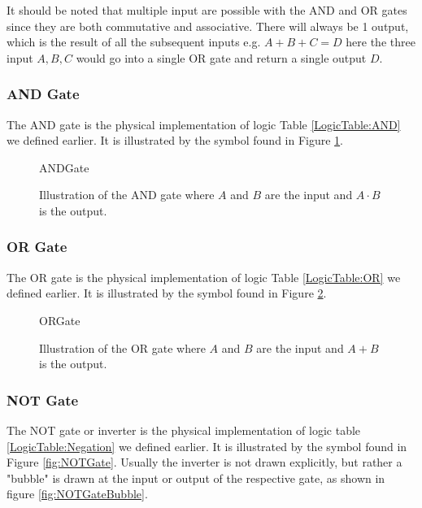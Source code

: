             It should be noted that multiple input are possible with the AND and OR gates since they are both commutative and associative. There will always be 1 output, which is the result of all the subsequent inputs e.g. $A+B+C=D$ here the three input $A,B,C$ would go into a single OR gate and return a single output $D$.
            
            \subsubsection{AND Gate}
                The AND gate is the physical implementation of logic Table \ref{LogicTable:AND} we defined earlier. It is illustrated by the symbol found in Figure \ref{fig:ANDGate}. 
                
                \begin{figure}[h!]
                    \centering
                    {ANDGate}
                    \caption{Illustration of the AND gate where $A$ and $B$ are the input and $A\cdot B$ is the output.}
                    \label{fig:ANDGate}
                \end{figure}
            
            \subsubsection{OR Gate}
            
                The OR gate is the physical implementation of logic Table \ref{LogicTable:OR} we defined earlier. It is illustrated by the symbol found in Figure \ref{fig:ORGate}. 
                
                \begin{figure}[h!]
                    \centering
                    {ORGate}
                    \caption{Illustration of the OR gate where $A$ and $B$ are the input and $A+B$ is the output.}
                    \label{fig:ORGate}
                \end{figure} 
            
            \subsubsection{NOT Gate}
            
                The NOT gate or inverter is the physical implementation of logic table \ref{LogicTable:Negation} we defined earlier. It is illustrated by the symbol found in Figure \ref{fig:NOTGate}. Usually the inverter is not drawn explicitly, but rather a "bubble" is drawn at the input or output of the respective gate, as shown in figure \ref{fig:NOTGateBubble}. 
                
